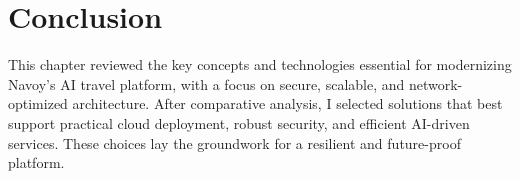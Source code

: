 \setcounter{secnumdepth}{0} %
\section{Conclusion}
This chapter reviewed the key concepts and technologies essential for modernizing Navoy's AI travel platform, with a focus on secure, scalable, and network-optimized architecture. After comparative analysis, I selected solutions that best support practical cloud deployment, robust security, and efficient AI-driven services. These choices lay the groundwork for a resilient and future-proof platform.
